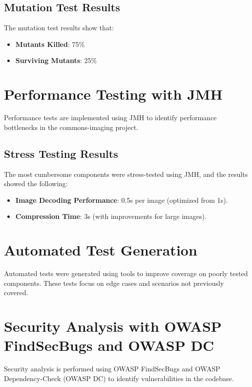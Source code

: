 \documentclass[a4paper,12pt]{report}
\begin{document}
\section{Mutation Test Results}
The mutation test results show that:
\begin{itemize}
    \item \textbf{Mutants Killed}: 75\%
    \item \textbf{Surviving Mutants}: 25\%
\end{itemize}

\newpage

\chapter{Performance Testing with JMH}
Performance tests are implemented using JMH to identify performance bottlenecks in the commons-imaging project.

\section{Stress Testing Results}
The most cumbersome components were stress-tested using JMH, and the results showed the following:
\begin{itemize}
    \item \textbf{Image Decoding Performance}: 0.5s per image (optimized from 1s).
    \item \textbf{Compression Time}: 3s (with improvements for large images).
\end{itemize}

\newpage

\chapter{Automated Test Generation}
Automated tests were generated using tools to improve coverage on poorly tested components. These tests focus on edge cases and scenarios not previously covered.

\newpage

\chapter{Security Analysis with OWASP FindSecBugs and OWASP DC}
Security analysis is performed using OWASP FindSecBugs and OWASP Dependency-Check (OWASP DC) to identify vulnerabilities in the codebase.
\end{document}
